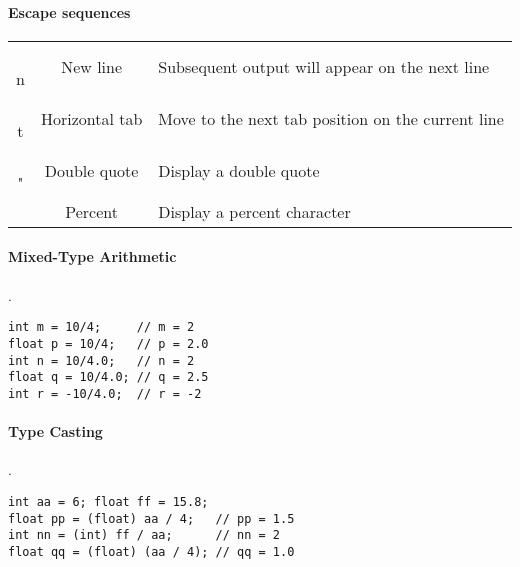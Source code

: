 \documentclass[a4paper]{article}
\begin{document}
\begin{multicols*}{3}
    \paragraph{Escape sequences}
      \begin{center}
        \begin{tabular}{ |c|c|M{4.2cm}| }
          \hline
           &  &  \\
          \hline
          \ic{\\n} & New line & Subsequent output will appear on the next line \\
          \hline
          \ic{\\t} & Horizontal tab & Move to the next tab position on the current line \\
          \hline
           & Double quote & Display a double quote  \\
          \hline
          \ic{\%\%} & Percent & Display a percent character \ic{\%} \\
          \hline
        \end{tabular}
      \end{center}
    \paragraph{Mixed-Type Arithmetic}.
      \begin{lstlisting}
int m = 10/4;     // m = 2
float p = 10/4;   // p = 2.0
int n = 10/4.0;   // n = 2
float q = 10/4.0; // q = 2.5
int r = -10/4.0;  // r = -2
      \end{lstlisting}
    \paragraph{Type Casting}.
      \begin{lstlisting}
int aa = 6; float ff = 15.8;
float pp = (float) aa / 4;   // pp = 1.5
int nn = (int) ff / aa;      // nn = 2
float qq = (float) (aa / 4); // qq = 1.0
      \end{lstlisting}

\end{multicols*}
\end{document}
